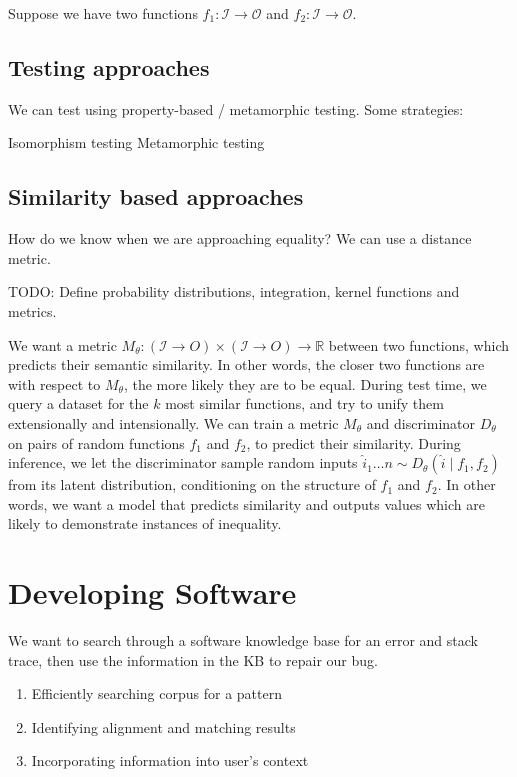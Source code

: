 \documentclass[11pt]{article}
\begin{document}
    Suppose we have two functions $f_1: \mathcal{I} \rightarrow \mathcal{O}$ and $f_2: \mathcal{I}\rightarrow \mathcal{O}$.


    \subsection{Testing approaches}

    We can test using property-based / metamorphic testing. Some strategies:

    Isomorphism testing
    Metamorphic testing

    \subsection{Similarity based approaches}

    How do we know when we are approaching equality? We can use a distance metric.

    TODO: Define probability distributions, integration, kernel functions and metrics.

    We want a metric $M_\theta: (\mathcal{I}\rightarrow{O}) \times (\mathcal{I}\rightarrow{O})\rightarrow \mathbb{R}$ between two functions, which predicts their semantic similarity. In other words, the closer two functions are with respect to $M_\theta$, the more likely they are to be equal. During test time, we query a dataset for the $k$ most similar functions, and try to unify them extensionally and intensionally. We can train a metric $M_\theta$ and discriminator $D_\theta$ on pairs of random functions $f_1$ and $f_2$, to predict their similarity. During inference, we let the discriminator sample random inputs $\hat i_1 \ldots n \sim D_\theta(\hat i \mid f_1, f_2)$ from its latent distribution, conditioning on the structure of $f_1$ and $f_2$. In other words, we want a model that predicts similarity and outputs values which are likely to demonstrate instances of inequality.

    \section{Developing Software}

    We want to search through a software knowledge base for an error and stack trace, then use the information in the KB to repair our bug.

    \begin{enumerate}
        \item Efficiently searching corpus for a pattern
        \item Identifying alignment and matching results
        \item Incorporating information into user's context
    \end{enumerate}
\end{document}
